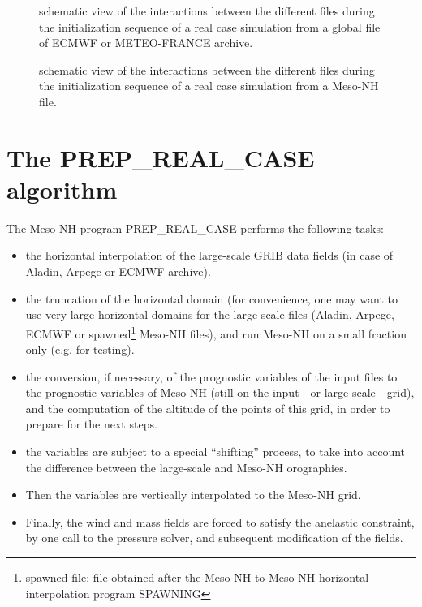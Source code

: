 \begin{figure}[htb]
\hspace*{-1.2cm}
\vspace*{-0.4cm}
\caption{schematic view of the interactions between the different files
during the initialization sequence of a real case simulation from a global file
of ECMWF or METEO-FRANCE archive.
\label{schematicsequence}}
\end{figure}

\begin{figure}[htb]
\hspace*{-1.2cm}
\vspace*{-0.4cm}
\caption{schematic view of the interactions between the different files
during the initialization sequence of a real case simulation from a Meso-NH file.
\label{schematicsequence2}}
\end{figure}


\clearpage

\section{The PREP\_REAL\_CASE algorithm}

The Meso-NH program PREP\_REAL\_CASE performs the following tasks:
\begin{itemize}
\item the horizontal interpolation of the large-scale GRIB data fields
(in case of Aladin, Arpege or ECMWF archive).
\item the truncation of the horizontal domain (for convenience, one may want
to use very large horizontal domains for the large-scale files
(Aladin, Arpege, ECMWF or spawned\footnote{spawned file: file obtained after the
Meso-NH to Meso-NH horizontal interpolation program SPAWNING} Meso-NH files),
and run Meso-NH on a small fraction only (e.g. for testing).
\item the conversion, if necessary, of the prognostic variables of the input files to the
prognostic variables of Meso-NH (still on the input - or large scale - grid), and the
computation of the altitude of the points of this grid, in order to
prepare for the next steps.
\item the variables are subject to a special ``shifting'' process,
to take into account the difference between the large-scale and Meso-NH orographies.
\item Then the variables are vertically interpolated to the Meso-NH grid.
\item Finally, the wind and mass fields are forced to satisfy the
anelastic constraint, by one call to the pressure solver, and subsequent
modification of the fields.
\end{itemize}

